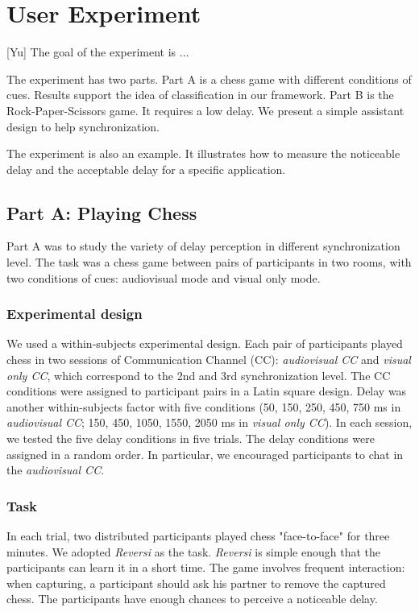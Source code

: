 \section{User Experiment}

[Yu] The goal of the experiment is ...

The experiment has two parts. Part A is a chess game with different conditions of cues. Results support the idea of classification in our framework. Part B is the Rock-Paper-Scissors game. It requires a low delay. We present a simple assistant design to help synchronization.

The experiment is also an example. It illustrates how to measure the noticeable delay and the acceptable delay for a specific application.

\subsection{Part A: Playing Chess}

Part A was to study the variety of delay perception in different synchronization level. The task was a chess game between pairs of participants in two rooms, with two conditions of cues: audiovisual mode and visual only mode.

\subsubsection{Experimental design}

We used a within-subjects experimental design. Each pair of participants played chess in two sessions of Communication Channel (CC): \emph{audiovisual CC} and \emph{visual only CC}, which correspond to the 2nd and 3rd synchronization level. The CC conditions were assigned to participant pairs in a Latin square design. Delay was another within-subjects factor with five conditions (50, 150, 250, 450, 750 ms in \emph{audiovisual CC}; 150, 450, 1050, 1550, 2050 ms in \emph{visual only CC}). In each session, we tested the five delay conditions in five trials. The delay conditions were assigned in a random order. In particular, we encouraged participants to chat in the \emph{audiovisual CC}.

\subsubsection{Task}

In each trial, two distributed participants played chess "face-to-face" for three minutes. We adopted \emph{Reversi} as the task. \emph{Reversi} is simple enough that the participants can learn it in a short time. The game involves frequent interaction: when capturing, a participant should ask his partner to remove the captured chess. The participants have enough chances to perceive a noticeable delay.

